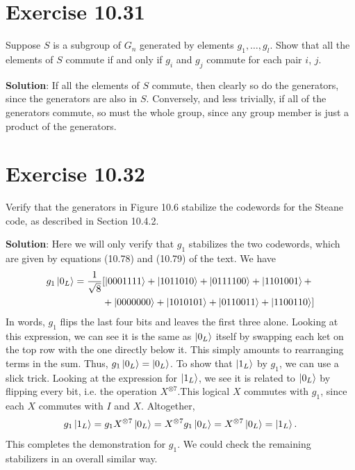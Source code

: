 \documentclass{book}
\begin{document}
\section*{Exercise 10.31}
    Suppose $S$ is a subgroup of $G_n$ generated by elements $g_1,\dots, g_l$. Show that all the elements of $S$ commute if and only if $g_i$ and $g_j$ commute for each pair $i$, $j$.
    
    \textbf{Solution}: If all the elements of $S$ commute, then clearly so do the generators, since the generators are also in $S$. Conversely, and less trivially, if all of the generators commute, so must the whole group, since any group member is just a product of the generators.
    
\section*{Exercise 10.32}
    Verify that the generators in Figure 10.6 stabilize the codewords for the Steane code, as described in Section 10.4.2.
    
    \textbf{Solution}: Here we will only verify that $g_1$ stabilizes the two codewords, which are given by equations (10.78) and (10.79) of the text. We have
    \begin{align}
    \begin{aligned}
        g_1\ket{0_L} = \frac{1}{\sqrt{8}}&[\ket{0001111}+\ket{1011010}+\ket{0111100}+\ket{1101001} + \\
        &+\ket{0000000}+\ket{1010101}+\ket{0110011}+\ket{1100110}] \\
    \end{aligned}
    \end{align}
    In words, $g_1$ flips the last four bits and leaves the first three alone. Looking at this expression, we can see it is the same as $\ket{0_L}$ itself by swapping each ket on the top row with the one directly below it. This simply amounts to rearranging terms in the sum. Thus, $g_1\ket{0_L} = \ket{0_L}$. To show that $\ket{1_L}$ by $g_1$, we can use a slick trick. Looking at the expression for $\ket{1_L}$, we see it is related to $\ket{0_L}$ by flipping every bit, i.e. the operation $X^{\otimes 7}$.This logical $X$ commutes with $g_1$, since each $X$ commutes with $I$ and $X$. Altogether,
    \begin{align}
        g_1\ket{1_L} = g_1 X^{\otimes 7}\ket{0_L} = X^{\otimes 7} g_1 \ket{0_L} = X^{\otimes 7} \ket{0_L} = \ket{1_L}.
    \end{align}
    This completes the demonstration for $g_1$. We could check the remaining stabilizers in an overall similar way.
    
\end{document}
